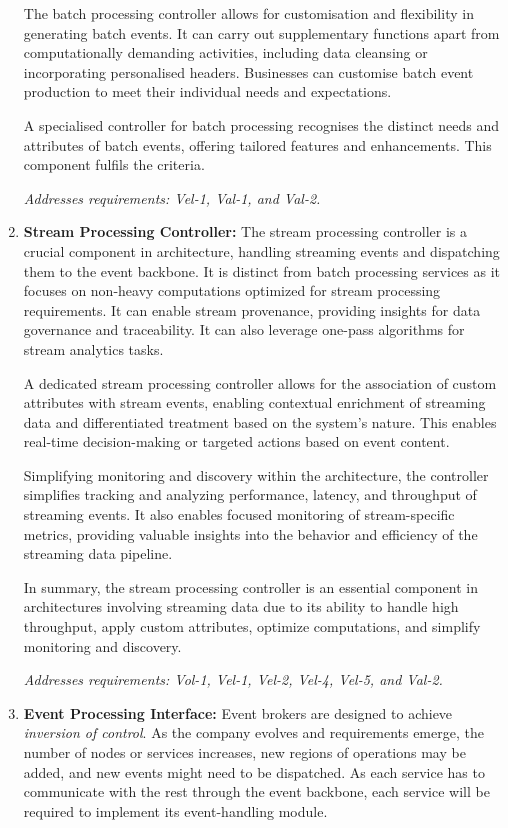 \documentclass[preprint,12pt]{elsarticle}
\begin{document}
\begin{enumerate}
    The batch processing controller allows for customisation and flexibility in generating batch events. It can carry out supplementary functions apart from computationally demanding activities, including data cleansing or incorporating personalised headers. Businesses can customise batch event production to meet their individual needs and expectations.
    
    A specialised controller for batch processing recognises the distinct needs and attributes of batch events, offering tailored features and enhancements. This component fulfils the criteria.

    \textit{Addresses requirements: Vel-1, Val-1, and Val-2.}
    
    \item \textbf{Stream Processing Controller:}  The stream processing controller is a crucial component in architecture, handling streaming events and dispatching them to the event backbone. It is distinct from batch processing services as it focuses on non-heavy computations optimized for stream processing requirements. It can enable stream provenance, providing insights for data governance and traceability. It can also leverage one-pass algorithms for stream analytics tasks.

    A dedicated stream processing controller allows for the association of custom attributes with stream events, enabling contextual enrichment of streaming data and differentiated treatment based on the system's nature. This enables real-time decision-making or targeted actions based on event content.
    
    Simplifying monitoring and discovery within the architecture, the controller simplifies tracking and analyzing performance, latency, and throughput of streaming events. It also enables focused monitoring of stream-specific metrics, providing valuable insights into the behavior and efficiency of the streaming data pipeline.
    
    In summary, the stream processing controller is an essential component in architectures involving streaming data due to its ability to handle high throughput, apply custom attributes, optimize computations, and simplify monitoring and discovery. 
    
    \textit{Addresses requirements: Vol-1, Vel-1, Vel-2, Vel-4, Vel-5, and Val-2.}

    
    \item \textbf{Event Processing Interface:} Event brokers are designed to achieve \emph{inversion of control}. As the company evolves and requirements emerge, the number of nodes or services increases, new regions of operations may be added, and new events might need to be dispatched. As each service has to communicate with the rest through the event backbone, each service will be required to implement its event-handling module. 
    

\end{enumerate}
\end{document}
